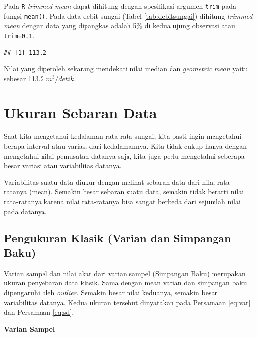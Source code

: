\documentclass[]{book}
\newenvironment{Shaded}{\begin{snugshade}}{\end{snugshade}}
\newcommand{\KeywordTok}[1]{\textcolor[rgb]{0.13,0.29,0.53}{\textbf{#1}}}
\newcommand{\DataTypeTok}[1]{\textcolor[rgb]{0.13,0.29,0.53}{#1}}
\newcommand{\FloatTok}[1]{\textcolor[rgb]{0.00,0.00,0.81}{#1}}
\newcommand{\OperatorTok}[1]{\textcolor[rgb]{0.81,0.36,0.00}{\textbf{#1}}}
\newcommand{\NormalTok}[1]{#1}
\begin{document}
Pada \texttt{R} \emph{trimmed mean} dapat dihitung dengan spesifikasi
argumen \texttt{trim} pada fungsi \texttt{mean()}. Pada data debit
sungai (Tabel \ref{tab:debitsungai}) dihitung \emph{trimmed mean} dengan
data yang dipangkas adalah 5\% di kedua ujung observasi atau
\texttt{trim=0.1}.

\begin{Shaded}
\end{Shaded}

\begin{verbatim}
## [1] 113.2
\end{verbatim}

Nilai yang diperoleh sekarang mendekati nilai median dan \emph{geometric
mean} yaitu sebesar 113.2 \(m^3/detik\).

\section{Ukuran Sebaran Data}\label{ukuran-sebaran-data}

Saat kita mengetahui kedalaman rata-rata sungai, kita pasti ingin
mengetahui berapa interval atau variasi dari kedalamannya. Kita tidak
cukup hanya dengan mengetahui nilai pemusatan datanya saja, kita juga
perlu mengetahui seberapa besar variasi atau variabilitas datanya.

Variabilitas suatu data diukur dengan melihat sebaran data dari nilai
rata-ratanya (mean). Semakin besar sebaran suatu data, semakin tidak
berarti nilai rata-ratanya karena nilai rata-ratanya bisa sangat berbeda
dari sejumlah nilai pada datanya.

\subsection{Pengukuran Klasik (Varian dan Simpangan
Baku)}\label{pengukuran-klasik-varian-dan-simpangan-baku}

Varian sampel dan nilai akar dari varian sampel (Simpangan Baku)
merupakan ukuran penyebaran data klasik. Sama dengan mean varian dan
simpangan baku dipengaruhi oleh \emph{outlier}. Semakin besar nilai
keduanya, semakin besar variabilitas datanya. Kedua ukuran tersebut
dinyatakan pada Persamaan \eqref{eq:var} dan Persamaan \eqref{eq:sd}.

\textbf{Varian Sampel}
\end{document}
